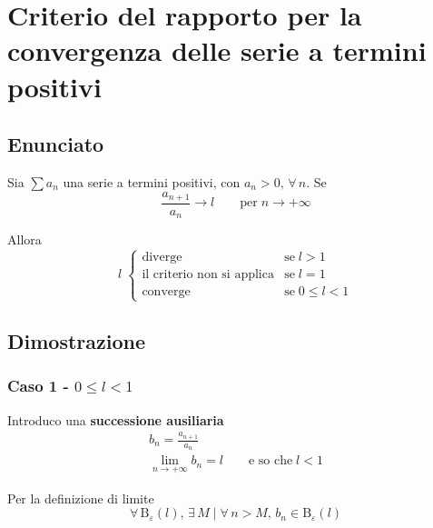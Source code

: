 \documentclass[../../analisi1]{subfiles}
\begin{document}
    \chapter{Criterio del rapporto per la convergenza delle serie a termini positivi}
    \label{criterioRapportoSerie}

        \section*{Enunciato}

            Sia \(\sum a_n\) una serie a termini positivi, con \(a_n > 0, \, \forall \, n\). Se
             \[\frac{a_{n+1}}{a_n} \longrightarrow l \qquad  \text{per} \; n \rightarrow +\infty \]
            
            Allora
            \[
                l \;
                \begin{cases}
                    \text{diverge} & \text{se} \; l > 1\\
                    \text{il criterio non si applica} & \text{se} \; l = 1\\
                    \text{converge} & \text{se} \; 0 \leqslant l < 1
                \end{cases}
            \]
            
        \section*{Dimostrazione}
            
            \subsection*{Caso 1 - \(0 \leqslant l < 1\)}

                Introduco una \textbf{successione ausiliaria}
                \begin{gather*}
                    b_n = \frac{a_{n+1}}{a_n}\\
                    \lim_{n \to +\infty} b_n = l \qquad \text{e so che} \; l < 1
                \end{gather*}

                Per la definizione di limite
                \[\forall \, \mathrm{B}_\varepsilon (l), \, \exists \, M \mid \forall \, n > M, \, b_n \in \mathrm{B}_\varepsilon (l) \]
\end{document}
